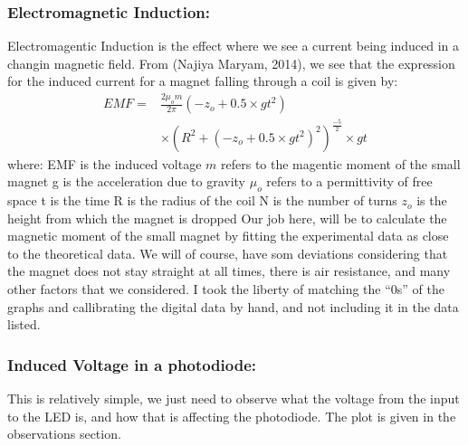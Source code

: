 \documentclass{multi}
\begin{document}
\subsubsection{Electromagnetic Induction:}
	Electromagentic Induction is the effect where we see a current being induced in a changin magnetic field. From (Najiya Maryam, 2014), we see that the expression for the induced current for a magnet falling through a coil is given by:
	\begin{align}
		EMF = &\frac{2\mu_o m}{2\pi}(-z_o+0.5\times gt^2) \\ \nonumber
		&\times (R^2+(-z_o+0.5\times gt^2)^2)^\frac{-5}{2}\times gt
	\end{align}
	where:
	\newline EMF is the induced voltage
	\newline $m$ refers to the magentic moment of the small magnet
	\newline g is the acceleration due to gravity
	\newline $\mu_o$ refers to a permittivity of free space
	\newline t is the time
	\newline R is the radius of the coil
	\newline N is the number of turns
	\newline $z_o$ is the height from which the magnet is dropped
	Our job here, will be to calculate the magnetic moment of the small magnet by fitting the experimental data as close to the theoretical data. We will of course, have som deviations considering that the magnet does not stay straight at all times, there is air resistance, and many other factors that we considered. I took the liberty of matching the ``0s'' of the graphs and callibrating the digital data by hand, and not including it in the data listed.
\subsubsection{Induced Voltage in a photodiode:}
	This is relatively simple, we just need to observe what the voltage from the input to the LED is, and how that is affecting the photodiode. The plot is given in the observations section.
\end{document}
